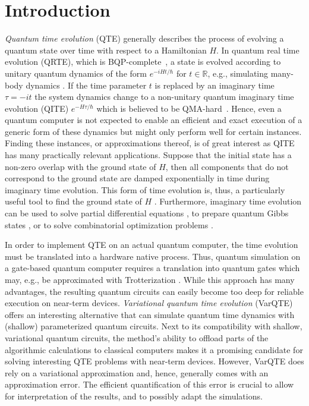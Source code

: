 \documentclass[twocolumn, aps, pra, superscriptaddress]{revtex4-1}
\begin{document}
\section{Introduction}
\textit{Quantum time evolution} (QTE) generally describes the process of evolving a quantum state over time with respect to a Hamiltonian $H$.
In quantum real time evolution (QRTE), which is BQP-complete~\cite{cmp18}, a state is evolved according to unitary quantum dynamics of the form $e^{-i H t/\hbar}$ for $t \in \mathbb{R}$, e.g., simulating many-body dynamics \cite{BarendsFermionicModels2015, SmithSimulatingQuantumManyBody2019, barison2021efficient}.
If the time parameter $t$ is replaced by an imaginary time $\tau=-i t$ the system dynamics change to a non-unitary quantum imaginary time evolution (QITE) $e^{- H \tau/\hbar}$ which is believed to be QMA-hard~\cite{kkr06}. Hence, even a quantum computer is not expected to enable an efficient and exact execution of a generic form of these dynamics but might only perform well for certain instances. Finding these instances, or approximations thereof, is of great interest as QITE has many practically relevant applications.
Suppose that the initial state has a non-zero overlap with the ground state of $H$, then all components that do not correspond to the ground state are damped exponentially in time during imaginary time evolution. This form of time evolution is, thus, a particularly useful tool to find the ground state of $H$ \cite{VarSITEMcArdle19}.
Furthermore, imaginary time evolution can be used to solve partial differential equations \cite{gonzalezconde2021pricing, fontanela2021quantumpdes, Kubo_2021StochastidDifferential}, to prepare quantum Gibbs states \cite{VarQBMZoufal20, Simon18TheoryVarQSim, MottaQITE20, Temme2011QuantumMS, YungQuantumMetropolis12, WiebeVariationalGibbs2020}, or to solve combinatorial optimization problems \cite{gacon2021simultaneous}.

In order to implement QTE on an actual quantum computer, the time evolution must be translated into a hardware native process. Thus, quantum simulation on a gate-based quantum computer requires a translation into quantum gates which may, e.g., be approximated with Trotterization \cite{Lloyd1073UniversalQuantumSim96, MottaQITE20}. While this approach has many advantages, the resulting quantum circuits can easily become too deep for reliable execution on near-term devices.
\textit{Variational quantum time evolution} (VarQTE)
\cite{VarSITEMcArdle19, Simon18TheoryVarQSim, EfficientVarQuantumSimErrorMinBenjamin17, Endo_2020VarQTEGeneralProcesses} offers an interesting alternative that can simulate quantum time dynamics with (shallow) parameterized quantum circuits. Next to its compatibility with shallow, variational quantum circuits, the method's ability to offload parts of the algorithmic calculations to classical computers makes it a promising candidate for solving interesting QTE problems with near-term devices.
However, VarQTE does rely on a variational approximation and, hence, generally comes with an approximation error. The efficient quantification of this error is crucial to allow for interpretation of the results, and to possibly adapt the simulations.
\end{document}
